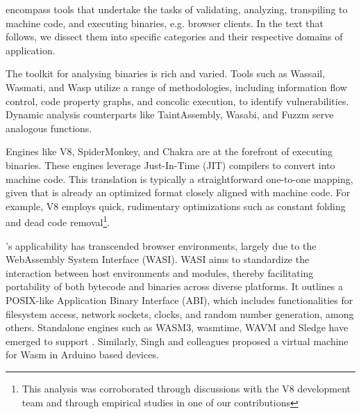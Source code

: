  encompass tools that undertake the tasks of validating, analyzing, transpiling to machine code, and executing \Wasm binaries, e.g. browser clients. 
In the text that follows, we dissect them into specific categories and their respective domains of application.

 \cite{WasmA}

 The toolkit for analysing \Wasm binaries is rich and varied. 
Tools such as Wassail\cite{wassail}, Wasmati\cite{wasmati}, and Wasp\cite{Wasp} utilize a range of methodologies, including information flow control, code property graphs, and concolic execution, to identify vulnerabilities. 
Dynamic analysis counterparts like TaintAssembly\cite{taintassembly}, Wasabi\cite{wasabi}, and Fuzzm\cite{fuzzm} serve analogous functions.

 Engines like V8\cite{v8}, SpiderMonkey\cite{spidermonkey}, and Chakra\cite{chakra} are at the forefront of executing \Wasm binaries. 
These engines leverage Just-In-Time (JIT) compilers to convert \Wasm into machine code. 
This translation is typically a straightforward one-to-one mapping, given that \Wasm is already an optimized format closely aligned with machine code. 
For example, V8 employs quick, rudimentary optimizations such as constant folding and dead code removal\footnote{This analysis was corroborated through discussions with the V8 development team and through empirical studies in one of our contributions\cite{CROW}}. 

 \Wasm's applicability has transcended browser environments, largely due to the WebAssembly System Interface (WASI)\cite{WASI}. 
WASI aims to standardize the interaction between host environments and \Wasm modules, thereby facilitating portability of both bytecode and binaries across diverse platforms. 
It outlines a POSIX-like Application Binary Interface (ABI), which includes functionalities for filesystem access, network sockets, clocks, and random number generation, among others. 
Standalone engines such as WASM3\cite{wasm3}, wasmtime\cite{wasmtime}, WAVM\cite{WAVM} and Sledge \cite{Sledge} have emerged to support \Wasm.
Similarly, Singh and colleagues \cite{WARDuino2019} proposed a virtual machine for Wasm in Arduino based devices.



